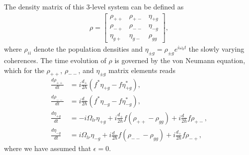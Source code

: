 \documentclass[onecolumn,secnumarabic,amssymb, nobibnotes, aip, prd]{revtex4-1}
\begin{document}
The density matrix of this 3-level system can be defined as 
\begin{align}
\rho = \begin{bmatrix}
\rho_{++} & \rho_{+-} & \eta_{+g} \\ 
\rho_{-+} & \rho_{--} & \eta_{-g} \\
\eta_{g+} & \eta_{g-} & \rho_{gg}
\end{bmatrix},
\end{align}
where $\rho_{ii}$ denote the population densities and $\eta_{\pm g} = \rho_{\pm g}e^{i\omega_0t}$ the slowly varying coherences. The time evolution of $\rho$ is governed by the von Neumann equation, which for the $\rho_{++}$, $\rho_{--}$, and $\eta_{\pm g}$ matrix elements reads  
\begin{subequations}
	\label{eq:4eqns}
	\begin{align}
	\frac{d \rho_{++}}{dt} &= i\frac{d_{+}}{2\hbar}(f^*\eta_{+g}-f\eta_{+g}^*), \\
	\frac{d \rho_{--}}{dt} &= i\frac{d_{-}}{2\hbar}(f^*\eta_{-g}-f\eta_{-g}^*), \\
	\frac{d \eta_{+g}}{dt} &= -i\Omega_{lr}\eta_{+g}+i\frac{d_{+}}{2\hbar}f(\rho_{++}-\rho_{gg})+i\frac{d_{-}}{2\hbar}f\rho_{+-}, \label{eq:eta+a}\\
	\frac{d \eta_{-g}}{dt} &= i\Omega_{lr}\eta_{-g}+i\frac{d_{-}}{2\hbar}f(\rho_{--}-\rho_{gg})+i\frac{d_{+}}{2\hbar}f\rho_{-+}, \label{eq:eta-a}
	\end{align}
\end{subequations}
where we have assumed that $\epsilon = 0$. 
\end{document}
